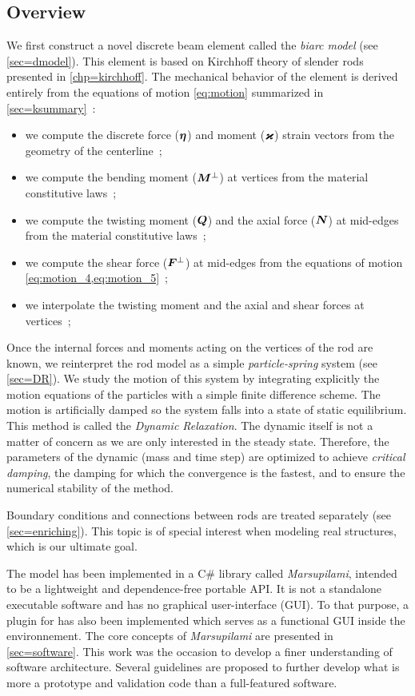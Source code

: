 \subsection{Overview}
We first construct a novel discrete beam element called the \emph{biarc model} (see \cref{sec=dmodel}). This element is based on Kirchhoff theory of slender rods presented in \cref{chp=kirchhoff}. The mechanical behavior of the element is derived entirely from the equations of motion \cref{eq:motion} summarized in \cref{sec=ksummary}~:
\begin{itemize}
\item we compute the discrete force ($\boldsymbol{\eta}$) and moment ($\boldsymbol{\varkappa}$) strain vectors from the geometry of the centerline~;
\item we compute the bending moment ($\boldsymbol{M}^{\perp}$) at vertices from the material constitutive laws~;
\item we compute the twisting moment ($\boldsymbol{Q}$) and the axial force ($\boldsymbol{N}$) at mid-edges from the material constitutive laws~;
\item we compute the shear force ($\boldsymbol{F}^{\perp}$) at mid-edges from the equations of motion \cref{eq:motion_4,eq:motion_5}~;
\item we interpolate the twisting moment and the axial and shear forces at vertices~;
\end{itemize}
Once the internal forces and moments acting on the vertices of the rod are known, we reinterpret the rod model as a simple \emph{particle-spring} system (see \cref{sec=DR}). We study the motion of this system by integrating explicitly the motion equations of the particles with a simple finite difference scheme. The motion is artificially damped so the system falls into a state of static equilibrium. This method is called the \emph{Dynamic Relaxation}. The dynamic itself is not a matter of concern as we are only interested in the steady state. Therefore, the parameters of the dynamic (mass and time step) are optimized to achieve \emph{critical damping}, the damping for which the convergence is the fastest, and to ensure the numerical stability of the method.

Boundary conditions and connections between rods are treated separately (see \cref{sec=enriching}). This topic is of special interest when modeling real structures, which is our ultimate goal.

The model has been implemented in a C\# library called \emph{Marsupilami}, intended to be a lightweight and dependence-free portable API. It is not a standalone executable software and has no graphical user-interface (GUI). To that purpose, a plugin for \grasshopper{} has also been implemented which serves as a functional GUI inside the \rhino{} environnement. The core concepts of \emph{Marsupilami} are presented in \cref{sec=software}. This work was the occasion to develop a finer understanding of software architecture. Several guidelines are proposed to further develop what is more a prototype and validation code than a full-featured software.

